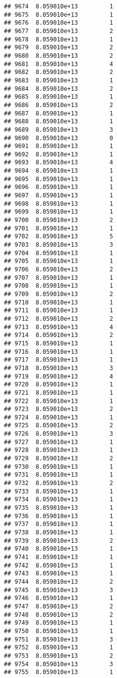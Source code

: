 \documentclass[
]{article}
\begin{document}
\begin{verbatim}
## 9674  8.059010e+13         1
## 9675  8.059010e+13         1
## 9676  8.059010e+13         1
## 9677  8.059010e+13         2
## 9678  8.059010e+13         1
## 9679  8.059010e+13         2
## 9680  8.059010e+13         2
## 9681  8.059010e+13         4
## 9682  8.059010e+13         2
## 9683  8.059010e+13         1
## 9684  8.059010e+13         2
## 9685  8.059010e+13         1
## 9686  8.059010e+13         2
## 9687  8.059010e+13         1
## 9688  8.059010e+13         1
## 9689  8.059010e+13         3
## 9690  8.059010e+13         0
## 9691  8.059010e+13         1
## 9692  8.059010e+13         1
## 9693  8.059010e+13         4
## 9694  8.059010e+13         1
## 9695  8.059010e+13         1
## 9696  8.059010e+13         1
## 9697  8.059010e+13         1
## 9698  8.059010e+13         1
## 9699  8.059010e+13         1
## 9700  8.059010e+13         2
## 9701  8.059010e+13         1
## 9702  8.059010e+13         5
## 9703  8.059010e+13         3
## 9704  8.059010e+13         1
## 9705  8.059010e+13         1
## 9706  8.059010e+13         2
## 9707  8.059010e+13         1
## 9708  8.059010e+13         1
## 9709  8.059010e+13         2
## 9710  8.059010e+13         1
## 9711  8.059010e+13         1
## 9712  8.059010e+13         2
## 9713  8.059010e+13         4
## 9714  8.059010e+13         2
## 9715  8.059010e+13         1
## 9716  8.059010e+13         1
## 9717  8.059010e+13         1
## 9718  8.059010e+13         3
## 9719  8.059010e+13         4
## 9720  8.059010e+13         1
## 9721  8.059010e+13         1
## 9722  8.059010e+13         1
## 9723  8.059010e+13         2
## 9724  8.059010e+13         1
## 9725  8.059010e+13         2
## 9726  8.059010e+13         3
## 9727  8.059010e+13         1
## 9728  8.059010e+13         1
## 9729  8.059010e+13         2
## 9730  8.059010e+13         1
## 9731  8.059010e+13         1
## 9732  8.059010e+13         2
## 9733  8.059010e+13         1
## 9734  8.059010e+13         1
## 9735  8.059010e+13         1
## 9736  8.059010e+13         1
## 9737  8.059010e+13         1
## 9738  8.059010e+13         1
## 9739  8.059010e+13         2
## 9740  8.059010e+13         1
## 9741  8.059010e+13         1
## 9742  8.059010e+13         1
## 9743  8.059010e+13         1
## 9744  8.059010e+13         2
## 9745  8.059010e+13         3
## 9746  8.059010e+13         1
## 9747  8.059010e+13         2
## 9748  8.059010e+13         2
## 9749  8.059010e+13         1
## 9750  8.059010e+13         1
## 9751  8.059010e+13         3
## 9752  8.059010e+13         1
## 9753  8.059010e+13         2
## 9754  8.059010e+13         3
## 9755  8.059010e+13         1

\end{verbatim}
\end{document}
